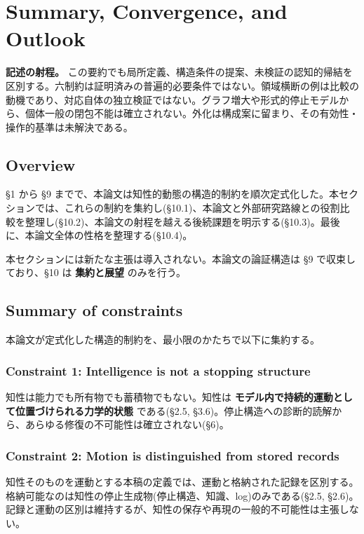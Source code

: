 \section{Summary, Convergence, and Outlook}

\noindent\textbf{記述の射程。} この要約でも局所定義、構造条件の提案、未検証の認知的帰結を区別する。六制約は証明済みの普遍的必要条件ではない。領域横断の例は比較の動機であり、対応自体の独立検証ではない。グラフ増大や形式的停止モデルから、個体一般の閉包不能は確立されない。外化は構成案に留まり、その有効性・操作的基準は未解決である。



\subsection{Overview}


\S{}1 から \S{}9 までで、本論文は知性的動態の構造的制約を順次定式化した。本セクションでは、これらの制約を集約し(\S{}10.1)、本論文と外部研究路線との役割比較を整理し(\S{}10.2)、本論文の射程を越える後続課題を明示する(\S{}10.3)。最後に、本論文全体の性格を整理する(\S{}10.4)。

本セクションには新たな主張は導入されない。本論文の論証構造は \S{}9 で収束しており、\S{}10 は \textbf{集約と展望} のみを行う。

\subsection{Summary of constraints}


本論文が定式化した構造的制約を、最小限のかたちで以下に集約する。

\subsubsection{Constraint 1: Intelligence is not a stopping structure}


知性は能力でも所有物でも蓄積物でもない。知性は \textbf{モデル内で持続的運動として位置づけられる力学的状態} である(\S{}2.5, \S{}3.6)。停止構造への診断的読解から、あらゆる修復の不可能性は確立されない(\S{}6)。

\subsubsection{Constraint 2: Motion is distinguished from stored records}


知性そのものを運動とする本稿の定義では、運動と格納された記録を区別する。格納可能なのは知性の停止生成物(停止構造、知識、log)のみである(\S{}2.5, \S{}2.6)。記録と運動の区別は維持するが、知性の保存や再現の一般的不可能性は主張しない。

